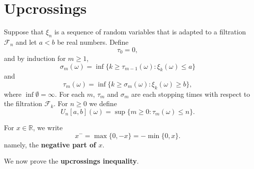 \documentclass{article}
\theoremstyle{definition}
\begin{document}
\section{Upcrossings}
Suppose that $\xi_n$ is a sequence of random variables that is adapted to a filtration $\mathscr{F}_n$ and let
$a<b$ be real numbers. Define
\[
\tau_0=0,
\]
and by induction for $m \geq 1$,
\[
\sigma_m(\omega) = \inf\{k \geq \tau_{m-1}(\omega): \xi_k(\omega) \leq a\}
\]
and
\[
\tau_m(\omega)=\inf\{k \geq \sigma_m(\omega): \xi_k(\omega) \geq b\},
\]
where $\inf \emptyset = \infty$. For each $m$, $\tau_m$ and $\sigma_m$ are each 
stopping times with respect to the filtration $\mathscr{F}_k$. 
For $n \geq 0$ we define
\[
U_n[a,b](\omega) = \sup\{m \geq 0: \tau_m(\omega) \leq n\}.
\]

For $x \in \mathbb{R}$, we write
\[
x^- = \max\{0,-x\} = -\min\{0,x\}.
\]
namely, the \textbf{negative part of $x$}.

We now prove the \textbf{upcrossings inequality}.
\end{document}

